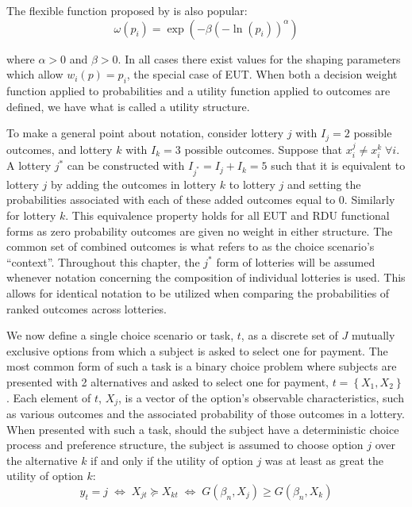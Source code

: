 \documentclass[../main.tex]{subfiles}
\begin{document}
\noindent The flexible function proposed by \textcite{Prelec1998} is also popular:
\begin{equation}
	\label{eq2:pw:prelec}
	\omega(p_i)=\exp(-\beta(-\ln(p_i))^\alpha)
\end{equation}

\noindent where $\alpha > 0$ and $\beta > 0$.
In all cases there exist values for the shaping parameters which allow $w_i(p) = p_i$, the special case of EUT.
When both a decision weight function applied to probabilities and a utility function applied to outcomes are defined, we have what is called a utility structure.

To make a general point about notation, consider lottery $j$ with $I_j = 2$ possible outcomes, and lottery $k$ with $I_k = 3$ possible outcomes.
Suppose that $x_i^j \neq x_i^k \; \forall i$.
A lottery $j^*$ can be constructed with $I_{j^*}= I_j + I_k = 5$ such that it is equivalent to lottery $j$ by adding the outcomes in lottery $k$ to lottery $j$ and setting the probabilities associated with each of these added outcomes equal to $0$.
Similarly for lottery $k$.
This equivalence property holds for all EUT and RDU functional forms as zero probability outcomes are given no weight in either structure.
The common set of combined outcomes is what \textcite{Wilcox2008} refers to as the choice scenario's \enquote{context}.
Throughout this chapter, the $j^*$ form of lotteries will be assumed whenever notation concerning the composition of individual lotteries is used.
This allows for identical notation to be utilized when comparing the probabilities of ranked outcomes across lotteries.

We now define a single choice scenario or task, $t$, as a discrete set of $J$ mutually exclusive options from which a subject is asked to select one for payment.
The most common form of such a task is a binary choice problem where subjects are presented with 2 alternatives and asked to select one for payment, $t=\left\{X_1,X_2\right\}$ .
Each element of $t$, $X_j$, is a vector of the option's observable characteristics, such as various outcomes and the associated probability of those outcomes in a lottery.
When presented with such a task, should the subject have a deterministic choice process and preference structure, the subject is assumed to choose option $j$ over the alternative $k$ if and only if the utility of option $j$ was at least as great the utility of option $k$:
\begin{equation}
	\label{eq2:ychoice}
	y_t = j \;\Leftrightarrow\; X_{jt} \succcurlyeq X_{kt} \;\Leftrightarrow\; G(\beta_n , X_j) \geq G(\beta_n , X_k)
\end{equation}
\end{document}
